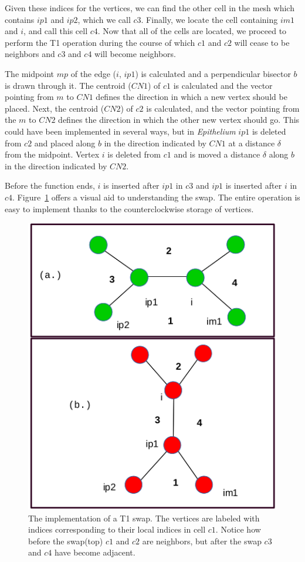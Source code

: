 Given these indices for the vertices, we can find the other cell in the mesh which contains $ip1$ and $ip2$, which we call $c3$. Finally, we locate the cell containing $im1$ and $i$, and call this cell $c4$. Now that all of the cells are located, we proceed to perform the T1 operation during the course of which $c1$ and $c2$ will cease to be neighbors and $c3$ and $c4$ will become neighbors. 

The midpoint $mp$ of the edge ($i$, $ip1$) is calculated and a perpendicular bisector $b$ is drawn through it. The centroid ($CN1$) of $c1$ is calculated and the vector pointing from $m$ to $CN1$ defines the direction in which a new vertex should be placed. Next, the centroid ($CN2$) of $c2$ is calculated, and the vector pointing from the $m$ to $CN2$ defines the direction in which the other new vertex should go. This could have been implemented in several ways, but in \emph{Epithelium} $ip1$ is deleted from $c2$ and placed along $b$ in the direction indicated by $CN1$ at a distance $\delta$ from the midpoint. Vertex $i$ is deleted from $c1$ and is moved a distance $\delta$ along $b$ in the direction indicated by $CN2$.

Before the function ends, $i$ is inserted after $ip1$ in $c3$ and $ip1$ is inserted after $i$ in $c4$. Figure~\ref{fig:t1pdf} offers a visual aid to understanding the swap. The entire operation is easy to implement thanks to the counterclockwise storage of vertices.

\begin{figure}
\centering
\includegraphics[height=0.5\textheight, keepaspectratio]{../diagrams/t1pdf.png}
\caption[Implementation of a T1 swap.]{The implementation of a T1 swap. The vertices are labeled with indices corresponding to their local indices in cell $c1$. Notice how before the swap(top) $c1$ and $c2$ are neighbors, but after the swap $c3$ and $c4$ have become adjacent.}
\label{fig:t1pdf}
\end{figure}

